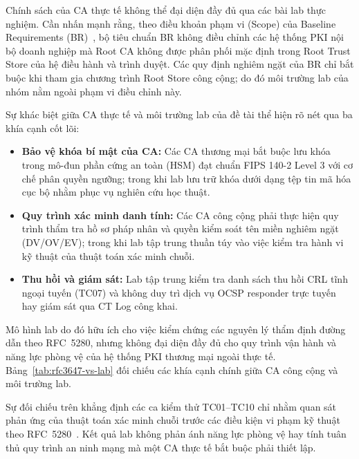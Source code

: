 Chính sách của CA thực tế không thể đại diện đầy đủ qua các bài lab thực nghiệm. Cần nhấn mạnh rằng, theo điều khoản phạm vi (Scope) của Baseline Requirements (BR)~\cite{cabforum_br}, bộ tiêu chuẩn BR không điều chỉnh các hệ thống PKI nội bộ doanh nghiệp mà Root CA không được phân phối mặc định trong Root Trust Store của hệ điều hành và trình duyệt. Các quy định nghiêm ngặt của BR chỉ bắt buộc khi tham gia chương trình Root Store công cộng; do đó môi trường lab của nhóm nằm ngoài phạm vi điều chỉnh này.

Sự khác biệt giữa CA thực tế và môi trường lab của đề tài thể hiện rõ nét qua ba khía cạnh cốt lõi:
\begin{itemize}\setlength{\itemsep}{1pt}\setlength{\parskip}{0pt}
    \item \textbf{Bảo vệ khóa bí mật của CA:} Các CA thương mại bắt buộc lưu khóa trong mô-đun phần cứng an toàn (HSM) đạt chuẩn FIPS 140-2 Level 3 với cơ chế phân quyền ngưỡng; trong khi lab lưu trữ khóa dưới dạng tệp tin mã hóa cục bộ nhằm phục vụ nghiên cứu học thuật.
    \item \textbf{Quy trình xác minh danh tính:} Các CA công cộng phải thực hiện quy trình thẩm tra hồ sơ pháp nhân và quyền kiểm soát tên miền nghiêm ngặt (DV/OV/EV); trong khi lab tập trung thuần túy vào việc kiểm tra hành vi kỹ thuật của thuật toán xác minh chuỗi.
    \item \textbf{Thu hồi và giám sát:} Lab tập trung kiểm tra danh sách thu hồi CRL tĩnh ngoại tuyến (TC07) và không duy trì dịch vụ OCSP responder trực tuyến hay giám sát qua CT Log công khai.
\end{itemize}
Mô hình lab do đó hữu ích cho việc kiểm chứng các nguyên lý thẩm định đường dẫn theo RFC~5280, nhưng không đại diện đầy đủ cho quy trình vận hành và năng lực phòng vệ của hệ thống PKI thương mại ngoài thực tế. Bảng~\ref{tab:rfc3647-vs-lab} đối chiếu các khía cạnh chính giữa CA công cộng và môi trường lab.



Sự đối chiếu trên khẳng định các ca kiểm thử TC01--TC10 chỉ nhằm quan sát phản ứng của thuật toán xác minh chuỗi trước các điều kiện vi phạm kỹ thuật theo RFC~5280~\cite{rfc5280}. Kết quả lab không phản ánh năng lực phòng vệ hay tính tuân thủ quy trình an ninh mạng mà một CA thực tế bắt buộc phải thiết lập.
